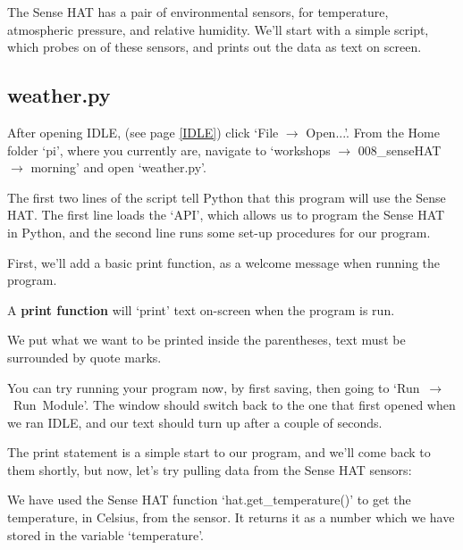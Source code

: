 \documentclass[a4paper, twocolumn, twoside, 12pt]{article}
\newenvironment{aside}
		{
		\begin{mdframed}[
			style=0,%
			leftline=false,
			rightline=false,
			innerbottommargin=2pt,
			innerleftmargin=12pt,
			innerrightmargin=0pt,
			linewidth=0.75pt,
			skipabove=6pt,
			skipbelow=6pt
			]
				\small
				\color{JungleGreen}
				\setlength{\parskip}{2pt}
				\vspace{2pt} %
		}
		{
		\end{mdframed}
		}
\begin{document}
		The Sense HAT has a pair of environmental sensors, for temperature, atmospheric pressure, and relative humidity.
		We'll start with a simple script, which probes on of these sensors, and prints out the data as text on screen.
		
		\subsection*{weather.py}
		
		After opening IDLE, (see page \ref{IDLE}) click `File $\rightarrow$ Open...'.
		From the Home folder `pi', where you currently are, navigate to
		`workshops $\rightarrow$ 008\_senseHAT $\rightarrow$ morning'
		and open `weather.py'.
		
		
		
			The first two lines of the script tell Python that this program will use the Sense HAT.
			The first line loads the `API', which allows us to program the Sense HAT in Python, and
			the second line runs some set-up procedures for our program.
			
			First, we'll add a basic print function, as a welcome message when running the program.
			
			\begin{aside}
				A \textbf{print function} will `print' text on-screen when the program is run.
				
				We put what we want to be printed inside the parentheses, text must be surrounded by quote marks.
			\end{aside}

		
		
			You can try running your program now, by first saving, then going to \mbox{`Run $\rightarrow$ Run Module'}. The window should switch back to the one that first opened when we ran IDLE, and our text should turn up after a couple of seconds.
			
			The print statement is a simple start to our program, and we'll come back to them shortly, but now, let's try pulling data from the Sense HAT sensors:
			
		
		
		We have used the Sense HAT function `hat.get\_temperature()' to get the temperature, in Celsius, from the sensor. It returns it as a number which we have stored in the variable `temperature'.
		
\end{document}
